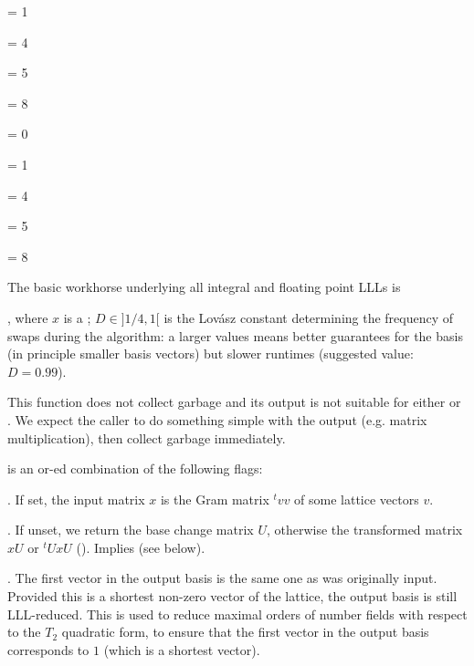  \fl = 1

 \fl = 4

 \fl = 5

 \fl = 8

\item {}

 \fl = 0

 \fl = 1

 \fl = 4

 \fl = 5

 \fl = 8

\smallskip

The basic workhorse underlying all integral and floating point LLLs is

, where $x$ is a ;
$D \in ]1/4,1[$ is the Lov\'{a}sz constant determining the frequency of
swaps during the algorithm: a larger values means better guarantees for the
basis (in principle smaller basis vectors) but slower runtimes (suggested
value: $D = 0.99$).

 This function does not collect garbage and its output
is not suitable for either  or . We expect
the caller to do something simple with the output (e.g. matrix
multiplication), then collect garbage immediately.

\noindent{} is an or-ed combination of the following flags:

\item  {}. If set, the input matrix $x$ is the Gram matrix ${}^t
v v$ of some lattice vectors $v$.

\item  {}. If unset, we return the base change matrix $U$,
otherwise the transformed matrix $x U$ or ${}^t U x U$ ().
Implies  (see below).

\item  {}. The first vector in the output basis is the same
one as was originally input. Provided this is a shortest non-zero vector of
the lattice, the output basis is still LLL-reduced. This is used to reduce
maximal orders of number fields with respect to the $T_2$ quadratic form, to
ensure that the first vector in the output basis corresponds to $1$ (which is
a shortest vector).

